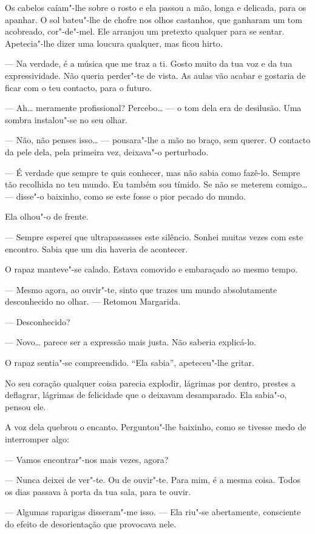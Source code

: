 Os cabelos caíam"-lhe sobre o rosto e ela passou a mão, longa e delicada,
para os apanhar. O sol bateu"-lhe de chofre nos olhos castanhos, que
ganharam um tom acobreado, cor"-de"-mel. Ele arranjou um pretexto qualquer
para se sentar. Apetecia"-lhe dizer uma loucura qualquer, mas ficou
hirto.

--- Na verdade, é a música que me traz a ti. Gosto muito da tua voz e da
tua expressividade. Não queria perder"-te de vista. As aulas vão acabar e
gostaria de ficar com o teu contacto, para o futuro.

--- Ah\ldots{} meramente profissional? Percebo\ldots{} --- o tom dela era de desilusão.
Uma sombra instalou"-se no seu olhar.

--- Não, não penses isso\ldots{} --- pousara"-lhe a mão no braço, sem querer. O
contacto da pele dela, pela primeira vez, deixava"-o perturbado.

--- É verdade que sempre te quis conhecer, mas não sabia como fazê-lo.
Sempre tão recolhida no teu mundo. Eu também sou tímido. Se não se
meterem comigo\ldots{} --- disse"-o baixinho, como se este fosse o pior pecado
do mundo.

Ela olhou"-o de frente.

--- Sempre esperei que ultrapassasses este silêncio. Sonhei muitas vezes
com este encontro. Sabia que um dia haveria de acontecer.

O rapaz manteve"-se calado. Estava comovido e embaraçado ao mesmo tempo.

--- Mesmo agora, ao ouvir"-te, sinto que trazes um mundo absolutamente
desconhecido no olhar. ---  Retomou Margarida.

--- Desconhecido?

--- Novo\ldots{} parece ser a expressão mais justa. Não saberia explicá-lo.

O rapaz sentia"-se compreendido. ``Ela sabia'', apeteceu"-lhe gritar.

No seu coração qualquer coisa parecia explodir, lágrimas por dentro,
prestes a deflagrar, lágrimas de felicidade que o deixavam desamparado.
Ela sabia"-o, pensou ele.

A voz dela quebrou o encanto. Perguntou"-lhe baixinho, como se tivesse
medo de interromper algo:

--- Vamos encontrar"-nos mais vezes, agora?

--- Nunca deixei de ver"-te. Ou de ouvir"-te. Para mim, é a mesma coisa.
Todos os dias passava à porta da tua sala, para te ouvir.

--- Algumas raparigas disseram"-me isso. --- Ela riu"-se abertamente,
consciente do efeito de desorientação que provocava nele.

